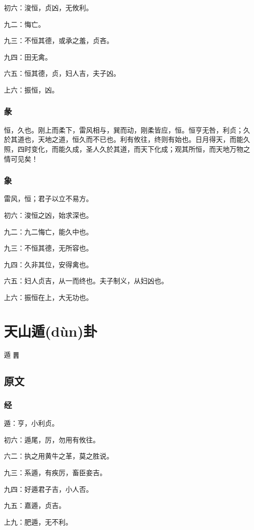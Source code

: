 \documentclass[12pt,oneside]{book}
\begin{document}
初六：浚恒，贞凶，无攸利。

九二：悔亡。

九三：不恒其德，或承之羞，贞吝。

九四：田无禽。

六五：恒其德，贞，妇人吉，夫子凶。

上六：振恒，凶。

\subsection{彖}
恒，久也。刚上而柔下，雷风相与，巽而动，刚柔皆应，恒。恒亨无咎，利贞；久於其道也，天地之道，恒久而不已也。利有攸往，终则有始也。日月得天，而能久照，四时变化，而能久成，圣人久於其道，而天下化成；观其所恒，而天地万物之情可见矣！

\subsection{象}
雷风，恒；君子以立不易方。

初六：浚恒之凶，始求深也。

九二：九二悔亡，能久中也。

九三：不恒其德，无所容也。

九四：久非其位，安得禽也。

六五：妇人贞吉，从一而终也。夫子制义，从妇凶也。

上六：振恒在上，大无功也。

\chapter{天山遁(dùn)卦}
遁 {\Large ䷠}

\section{原文}

\subsection{经}
遁：亨，小利贞。

初六：遁尾，厉，勿用有攸往。

六二：执之用黄牛之革，莫之胜说。

九三：系遁，有疾厉，畜臣妾吉。

九四：好遁君子吉，小人否。

九五：嘉遁，贞吉。

上九：肥遁，无不利。
\end{document}

